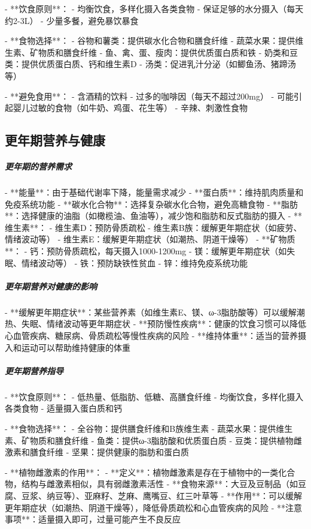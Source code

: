 \begin{enumerate}
- **饮食原则**：
  - 均衡饮食，多样化摄入各类食物
  - 保证足够的水分摄入（每天约2-3L）
  - 少量多餐，避免暴饮暴食

- **食物选择**：
  - 谷物和薯类：提供碳水化合物和膳食纤维
  - 蔬菜水果：提供维生素、矿物质和膳食纤维
  - 鱼、禽、蛋、瘦肉：提供优质蛋白质和铁
  - 奶类和豆类：提供优质蛋白质、钙和维生素D
  - 汤类：促进乳汁分泌（如鲫鱼汤、猪蹄汤等）

- **避免食用**：
  - 含酒精的饮料
  - 过多的咖啡因（每天不超过200mg）
  - 可能引起婴儿过敏的食物（如牛奶、鸡蛋、花生等）
  - 辛辣、刺激性食物

\subsection{更年期营养与健康}

\subparagraph{更年期的营养需求}

- **能量**：由于基础代谢率下降，能量需求减少
- **蛋白质**：维持肌肉质量和免疫系统功能
- **碳水化合物**：选择复杂碳水化合物，避免高糖食物
- **脂肪**：选择健康的油脂（如橄榄油、鱼油等），减少饱和脂肪和反式脂肪的摄入
- **维生素**：
  - 维生素D：预防骨质疏松
  - 维生素B族：缓解更年期症状（如疲劳、情绪波动等）
  - 维生素E：缓解更年期症状（如潮热、阴道干燥等）
- **矿物质**：
  - 钙：预防骨质疏松，每天摄入1000-1200mg
  - 镁：缓解更年期症状（如失眠、情绪波动等）
  - 铁：预防缺铁性贫血
  - 锌：维持免疫系统功能

\subparagraph{更年期营养对健康的影响}

- **缓解更年期症状**：某些营养素（如维生素E、镁、ω-3脂肪酸等）可以缓解潮热、失眠、情绪波动等更年期症状
- **预防慢性疾病**：健康的饮食习惯可以降低心血管疾病、糖尿病、骨质疏松等慢性疾病的风险
- **维持体重**：适当的营养摄入和运动可以帮助维持健康的体重

\subparagraph{更年期营养指导}

- **饮食原则**：
  - 低热量、低脂肪、低糖、高膳食纤维
  - 均衡饮食，多样化摄入各类食物
  - 适量摄入蛋白质和钙

- **食物选择**：
  - 全谷物：提供膳食纤维和B族维生素
  - 蔬菜水果：提供维生素、矿物质和膳食纤维
  - 鱼类：提供ω-3脂肪酸和优质蛋白质
  - 豆类：提供植物雌激素和膳食纤维
  - 坚果：提供健康的脂肪和蛋白质

- **植物雌激素的作用**：
  - **定义**：植物雌激素是存在于植物中的一类化合物，结构与雌激素相似，具有弱雌激素活性
  - **食物来源**：大豆及豆制品（如豆腐、豆浆、纳豆等）、亚麻籽、芝麻、鹰嘴豆、红三叶草等
  - **作用**：可以缓解更年期症状（如潮热、阴道干燥等），降低骨质疏松和心血管疾病的风险
  - **注意事项**：适量摄入即可，过量可能产生不良反应


\end{enumerate}
